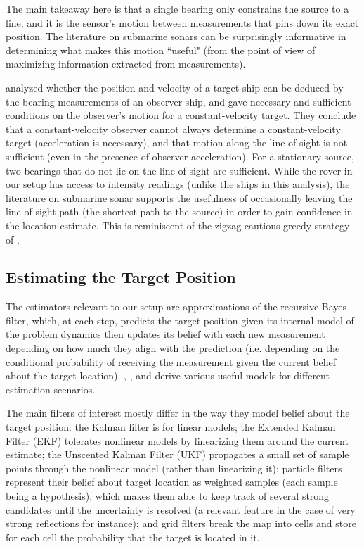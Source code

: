 \documentclass[journal,a4paper]{IEEEtran}
\begin{document}
The main takeaway here is that a single bearing only constrains the source to a line, and it is the sensor's motion between
measurements that pins down its exact position. The literature on submarine sonars can be surprisingly informative in determining what makes this motion ``useful" (from the point of view of maximizing information extracted from measurements). 

\citet{lingren1978position} analyzed whether the position and velocity of a target ship can be deduced by the bearing measurements of an observer ship, and \citet{nardone1981observability} gave
necessary and sufficient conditions on the observer's motion for a constant-velocity target. They conclude that a constant-velocity observer cannot always determine a constant-velocity target (acceleration is necessary), and that motion along the line of sight is not sufficient (even in the presence of observer acceleration). For a stationary source, two bearings that do not lie on the line of sight are sufficient. 
While the rover in our setup has access to intensity readings (unlike the ships in this analysis), the literature on submarine sonar supports the usefulness of occasionally leaving the line of sight path (the shortest path to the source) in order to gain confidence in the location estimate. This is reminiscent of the zigzag cautious greedy strategy of \citet{vanderhook2014cautious}.


\subsection{Estimating the Target Position}

The estimators relevant to our setup are approximations of the recursive Bayes filter, which, at each step, predicts the target position given its internal model of the problem dynamics then updates its belief with each new measurement depending on how much they align with the prediction (i.e. depending on the conditional probability of receiving the measurement given the current belief about the target location). \citet{thrun2005probabilistic}, \citet{barshalom2001estimation}, and \citet{simon2006optimal} derive various useful models for different estimation scenarios.

The main filters of interest mostly differ in the way they model belief about the target position: the Kalman filter \citep{kalman1960new} is for linear models; the Extended Kalman Filter (EKF) tolerates nonlinear models by linearizing them around the current estimate; the Unscented Kalman Filter (UKF) \citep{julier2004unscented} propagates a small set of sample points through the nonlinear model (rather than linearizing it); particle filters \citep{gordon1993novel,arulampalam2002tutorial} represent their belief about target location as weighted samples (each sample being a hypothesis), which makes them able to keep track of several strong candidates until the uncertainty is resolved (a relevant feature in the case of very strong reflections for instance); and grid filters break the map into cells and store for each cell the probability that the target is located in it.
\end{document}

